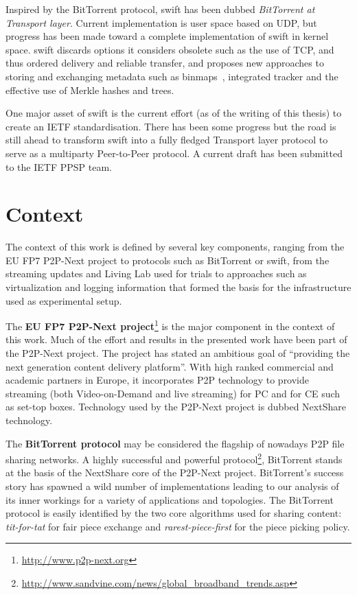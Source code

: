 Inspired by the BitTorrent protocol, swift has been dubbed \textit{BitTorrent
at Transport layer}. Current implementation is user space based on UDP, but
progress has been made toward a complete implementation of swift in kernel
space. swift discards options it considers obsolete such as the use of TCP,
and thus ordered delivery and reliable transfer, and proposes new approaches
to storing and exchanging metadata such as binmaps~\cite{binmaps}, integrated
tracker and the effective use of Merkle hashes and trees.

One major asset of swift is the current effort (as of the writing of this
thesis) to create an IETF standardisation. There has been some progress but
the road is still ahead to transform swift into a fully fledged
Transport layer protocol to serve as a multiparty Peer-to-Peer protocol. A
current draft has been submitted to the IETF PPSP team.

\section{Context}
\label{sec:intro:context}

The context of this work is defined by several key components, ranging from
the EU FP7 P2P-Next project to protocols such as BitTorrent or swift, from
the streaming updates and Living Lab used for trials to approaches such as
virtualization and logging information that formed the basis for the
infrastructure used as experimental setup.

The \textbf{EU FP7 P2P-Next project}\footnote{\url{http://www.p2p-next.org}} is the
major component in the context of this work. Much of the effort and results in
the presented work have been part of the P2P-Next project. The project has
stated an ambitious goal of ``providing the next generation content delivery
platform''. With high ranked commercial and academic partners in Europe, it
incorporates P2P technology to provide streaming (both Video-on-Demand and
live streaming) for PC and for CE such as set-top boxes. Technology used by
the P2P-Next project is dubbed NextShare technology.

The \textbf{BitTorrent protocol} may be considered the flagship of nowadays
P2P file sharing networks. A highly successful and powerful
protocol\footnote{\url{http://www.sandvine.com/news/global\_broadband\_trends.asp}},
BitTorrent stands at the basis of the NextShare core of the P2P-Next project.
BitTorrent's success story has spawned a wild number of implementations
leading to our analysis of its inner workings for a variety of applications and
topologies. The BitTorrent protocol is easily identified by the two core
algorithms used for sharing content: \textit{tit-for-tat} for fair piece
exchange and \textit{rarest-piece-first} for the piece picking policy.

